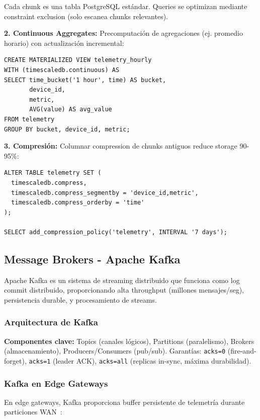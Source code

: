 Cada chunk es una tabla PostgreSQL estándar. Queries se optimizan mediante constraint exclusion (solo escanea chunks relevantes).

\textbf{2. Continuous Aggregates:} Precomputación de agregaciones (ej. promedio horario) con actualización incremental:

\begin{verbatim}
CREATE MATERIALIZED VIEW telemetry_hourly
WITH (timescaledb.continuous) AS
SELECT time_bucket('1 hour', time) AS bucket,
       device_id,
       metric,
       AVG(value) AS avg_value
FROM telemetry
GROUP BY bucket, device_id, metric;
\end{verbatim}

\textbf{3. Compresión:} Columnar compression de chunks antiguos reduce storage 90-95\%:

\begin{verbatim}
ALTER TABLE telemetry SET (
  timescaledb.compress,
  timescaledb.compress_segmentby = 'device_id,metric',
  timescaledb.compress_orderby = 'time'
);

SELECT add_compression_policy('telemetry', INTERVAL '7 days');
\end{verbatim}

\subsection{Message Brokers - Apache Kafka}

Apache Kafka es un sistema de streaming distribuido que funciona como log commit distribuido, proporcionando alta throughput (millones mensajes/seg), persistencia durable, y procesamiento de streams.

\subsubsection{Arquitectura de Kafka}

\textbf{Componentes clave:} Topics (canales lógicos), Partitions (paralelismo), Brokers (almacenamiento), Producers/Consumers (pub/sub). Garantías: \texttt{acks=0} (fire-and-forget), \texttt{acks=1} (leader ACK), \texttt{acks=all} (replicas in-sync, máxima durabilidad).

\subsubsection{Kafka en Edge Gateways}

En edge gateways, Kafka proporciona buffer persistente de telemetría durante particiones WAN~\cite{amiriDeploymentArchitecturesMQTT2024}:

